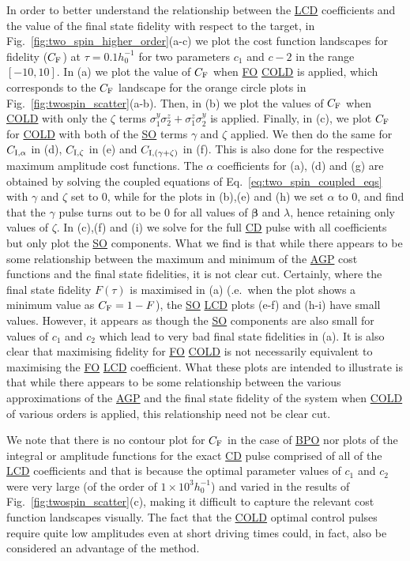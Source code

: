 \documentclass[a4paper,oneside,11pt]{book}
\newcommand{\betabb}{\boldsymbol{\beta}}
\newcommand{\sy}{\sigma^y}
\newcommand{\sz}{\sigma^z}
\newcommand{\acrref}[1]{\hyperref[acr:#1]{#1}}
\begin{document}
In order to better understand the relationship between the \acrref{LCD} coefficients and the value of the final state fidelity with respect to the target, in Fig.~\ref{fig:two_spin_higher_order}(a-c) we plot the cost function landscapes for fidelity ($C_{\rm F}$) at $\tau = 0.1h_0^{-1}$ for two parameters $c_1$ and $c-2$ in the range $[-10, 10]$. In (a) we plot the value of $C_{\rm F}$ when \acrref{FO} \acrref{COLD} is applied, which corresponds to the $C_{\rm F}$ landscape for the orange circle plots in Fig.~\ref{fig:twospin_scatter}(a-b). Then, in (b) we plot the values of $C_{\rm F}$ when \acrref{COLD} with only the $\zeta$ terms $\sy_1\sz_2 + \sz_1\sy_2$ is applied. Finally, in (c), we plot $C_{\rm F}$ for  \acrref{COLD} with both of the \acrref{SO} terms $\gamma$ and $\zeta$ applied.  We then do the same for $C_{\rm I, \alpha}$ in (d), $C_{\rm I,\zeta}$ in (e) and $C_{\rm I,(\gamma + \zeta)}$ in (f). This is also done for the respective maximum amplitude cost functions. The $\alpha$ coefficients for (a), (d) and (g) are obtained by solving the coupled equations of Eq.~\eqref{eq:two_spin_coupled_eqs} with $\gamma$ and $\zeta$ set to $0$, while for the plots in (b),(e) and (h) we set $\alpha$ to $0$, and find that the $\gamma$ pulse turns out to be $0$ for all values of $\betabb$ and $\lambda$, hence retaining only values of $\zeta$. In (c),(f) and (i) we solve for the full \acrref{CD} pulse with all coefficients but only plot the \acrref{SO} components. What we find is that while there appears to be some relationship between the maximum and minimum of the \acrref{AGP} cost functions and the final state fidelities, it is not clear cut. Certainly, where the final state fidelity $F(\tau)$ is maximised in (a) (\@i.e.~when the plot shows a minimum value as $C_{\rm F} = 1 - F$), the \acrref{SO} \acrref{LCD} plots (e-f) and (h-i) have small values. However, it appears as though the \acrref{SO} components are also small for values of $c_1$ and $c_2$ which lead to very bad final state fidelities in (a). It is also clear that maximising fidelity for \acrref{FO} \acrref{COLD} is not necessarily equivalent to maximising the \acrref{FO} \acrref{LCD} coefficient. What these plots are intended to illustrate is that while there appears to be some relationship between the various approximations of the \acrref{AGP} and the final state fidelity of the system when \acrref{COLD} of various orders is applied, this relationship need not be clear cut.

We note that there is no contour plot for $C_{\rm F}$ in the case of \acrref{BPO} nor plots of the integral or amplitude functions for the exact \acrref{CD} pulse comprised of all of the \acrref{LCD} coefficients and that is because the optimal parameter values of $c_1$ and $c_2$ were very large (of the order of $1\times10^3 h_0^{-1}$) and varied in the results of Fig.~\ref{fig:twospin_scatter}(c), making it difficult to capture the relevant cost function landscapes visually. The fact that the \acrref{COLD} optimal control pulses require quite low amplitudes even at short driving times could, in fact, also be considered an advantage of the method.
\end{document}
